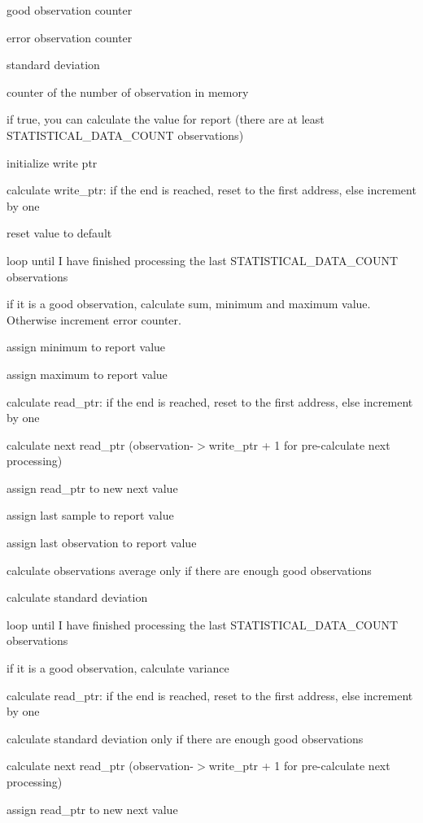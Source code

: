 good observation counter

error observation counter

standard deviation

counter of the number of observation in memory

if true, you can calculate the value for report (there are at least S\+T\+A\+T\+I\+S\+T\+I\+C\+A\+L\+\_\+\+D\+A\+T\+A\+\_\+\+C\+O\+U\+NT observations)

initialize write ptr

calculate write\+\_\+ptr\+: if the end is reached, reset to the first address, else increment by one

reset value to default

loop until I have finished processing the last S\+T\+A\+T\+I\+S\+T\+I\+C\+A\+L\+\_\+\+D\+A\+T\+A\+\_\+\+C\+O\+U\+NT observations

if it is a good observation, calculate sum, minimum and maximum value. Otherwise increment error counter.

assign minimum to report value

assign maximum to report value

calculate read\+\_\+ptr\+: if the end is reached, reset to the first address, else increment by one

calculate next read\+\_\+ptr (observation-\/$>$write\+\_\+ptr + 1 for pre-\/calculate next processing)

assign read\+\_\+ptr to new next value

assign last sample to report value

assign last observation to report value

calculate observations average only if there are enough good observations

calculate standard deviation

loop until I have finished processing the last S\+T\+A\+T\+I\+S\+T\+I\+C\+A\+L\+\_\+\+D\+A\+T\+A\+\_\+\+C\+O\+U\+NT observations

if it is a good observation, calculate variance

calculate read\+\_\+ptr\+: if the end is reached, reset to the first address, else increment by one

calculate standard deviation only if there are enough good observations

calculate next read\+\_\+ptr (observation-\/$>$write\+\_\+ptr + 1 for pre-\/calculate next processing)

assign read\+\_\+ptr to new next value \mbox{\label{i2c-th_8ino_a4c8e037e3b3f4c043abf3de8cf57fe68}} 
